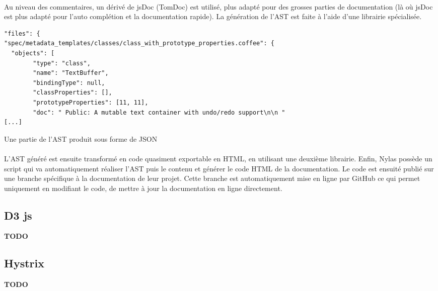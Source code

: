         \paragraph{}
            Au niveau des commentaires, un dérivé de jsDoc (TomDoc\cite{tomdoc}) est utilisé, plus adapté
            pour des grosses parties de documentation (là où jsDoc est plus adapté pour l'auto complétion et la documentation rapide).
            La génération de l'AST est faite à l'aide d'une librairie spécialisée\cite{donna}.
        \begin{listing}[ht]
            \begin{verbatim}
"files": {
"spec/metadata_templates/classes/class_with_prototype_properties.coffee": {
  "objects": [
        "type": "class",
        "name": "TextBuffer",
        "bindingType": null,
        "classProperties": [],
        "prototypeProperties": [11, 11],
        "doc": " Public: A mutable text container with undo/redo support\n\n "
[...]
            \end{verbatim}
            \caption{Une partie de l'AST produit sous forme de JSON}
        \end{listing}

        \paragraph{}
            L'AST généré est ensuite transformé en code quasiment exportable en HTML, en utilisant une deuxième librairie\cite{tello}.
            Enfin, Nylas possède un script qui va automatiquement réaliser l'AST puis le contenu et générer le code HTML de la documentation.
            Le code est ensuité publié sur une branche spécifique à la documentation de leur projet.
            Cette branche est automatiquement mise en ligne par GitHub\cite{ghpages} ce qui permet uniquement en
            modifiant le code, de mettre à jour la documentation en ligne directement.

\newpage
\subsection{D3 js}
    \textbf{TODO}

\subsection{Hystrix}
    \textbf{TODO}
